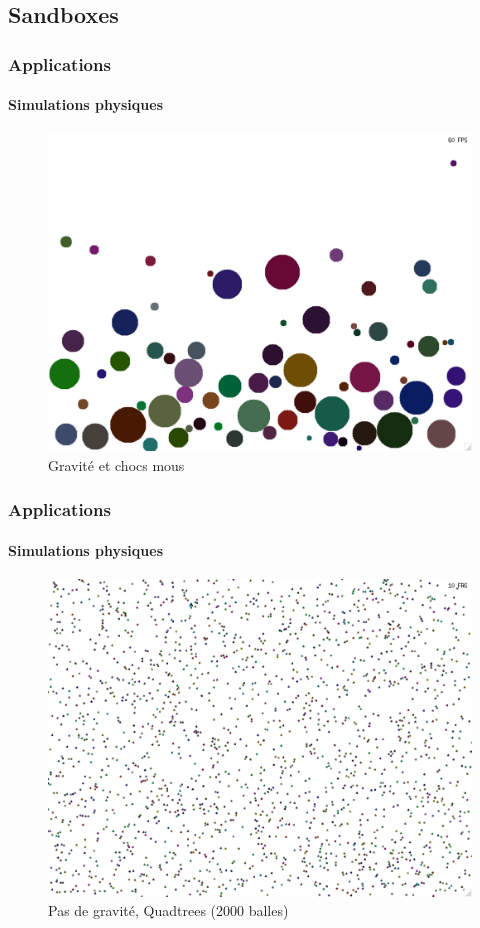 \documentclass[xcolor=x11names,compress,11pt]{beamer}
\renewcommand{\(}{\begin{columns}}
\renewcommand{\)}{\end{columns}}
\newcommand{\<}[1]{\begin{column}{#1}}
\renewcommand{\>}{\end{column}}
\begin{document}
\subsection*{Sandboxes}
\begin{frame}
  \frametitle{Applications}
  \framesubtitle{Simulations physiques}
  \begin{figure}[h]
    \centering
    \includegraphics[scale=0.27]{test0.pdf}
    \caption{Gravité et chocs mous}
    
  \end{figure}
\end{frame}

\begin{frame}
  \frametitle{Applications}
  \framesubtitle{Simulations physiques}
  \begin{figure}[h]
    \centering
    \includegraphics[scale=0.27]{test1.pdf}
    \caption{Pas de gravité, Quadtrees (2000 balles)}
  \end{figure}
\end{frame}
\end{document}
